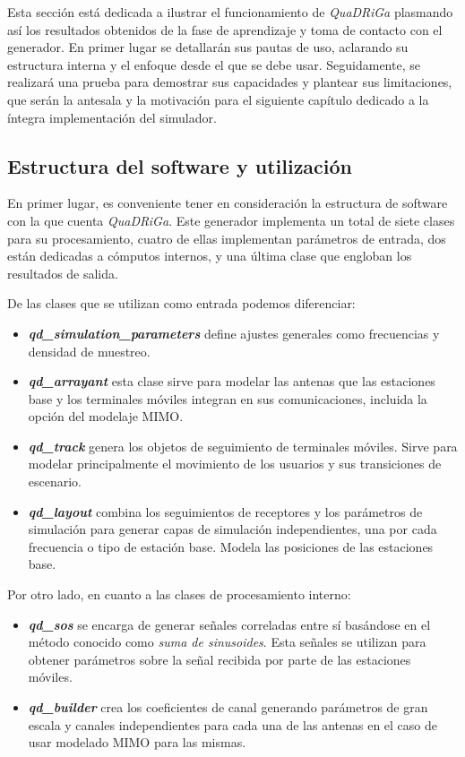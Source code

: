 Esta sección está dedicada a ilustrar el funcionamiento de \textit{QuaDRiGa} plasmando así los resultados obtenidos de la fase de aprendizaje y toma de contacto con el generador. En primer lugar se detallarán sus pautas de uso, aclarando su estructura interna y el enfoque desde el que se debe usar. Seguidamente, se realizará una prueba para demostrar sus capacidades y plantear sus limitaciones, que serán la antesala y la motivación para el siguiente capítulo dedicado a la íntegra implementación del simulador.

\subsection{Estructura del software y utilización}

En primer lugar, es conveniente tener en consideración la estructura de software con la que cuenta \textit{QuaDRiGa}. Este generador implementa un total de siete clases para su procesamiento, cuatro de ellas implementan parámetros de entrada, dos están dedicadas a cómputos internos, y una última clase que engloban los resultados de salida.

De las clases que se utilizan como entrada podemos diferenciar:
\begin{itemize}
    \item \textbf{\textit{qd\_simulation\_parameters}} define ajustes generales como frecuencias y densidad de muestreo.
    \item \textit{\textbf{qd\_arrayant}} esta clase sirve para modelar las antenas que las estaciones base y los terminales móviles integran en sus comunicaciones, incluida la opción del modelaje MIMO.
    \item \textbf{\textit{qd\_track}} genera los objetos de seguimiento de terminales móviles. Sirve para modelar principalmente el movimiento de los usuarios y sus transiciones de escenario.
    \item \textbf{\textit{qd\_layout}} combina los seguimientos de receptores y los parámetros de simulación para generar capas de simulación independientes, una por cada frecuencia o tipo de estación base. Modela las posiciones de las estaciones base.
\end{itemize}

Por otro lado, en cuanto a las clases de procesamiento interno:

\begin{itemize}
    \item \textbf{\textit{qd\_sos}} se encarga de generar señales correladas entre sí basándose en el método conocido como \textit{suma de sinusoides}. Esta señales se utilizan para obtener parámetros sobre la señal recibida por parte de las estaciones móviles. 
    \item \textbf{\textit{qd\_builder}} crea los coeficientes de canal generando parámetros de gran escala y canales independientes para cada una de las antenas en el caso de usar modelado MIMO para las mismas.
\end{itemize}

